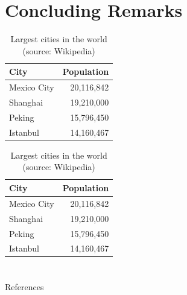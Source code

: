 \documentclass[
10pt,notheorems,compress,hyperref={pdfauthor=Maghfira Ramadhani}
]{beamer}
\begin{document}
\section{Concluding Remarks}
\begin{frame}
    \begin{table}
        \caption{Largest cities in the world (source: Wikipedia)}
        \begin{tabular}{@{} lr @{}}
          \toprule
          City & Population\\
          \midrule
          Mexico City & 20,116,842\\
          Shanghai & 19,210,000\\
          Peking & 15,796,450\\
          Istanbul & 14,160,467\\
          \bottomrule
        \end{tabular}
        \hspace*{1cm}
            \setlength\extrarowheight{3pt}
        \begin{tabular}{|lr|}
          \hline
          \rowcolor{primary}\color{white}City & \color{white}Population\\
          \hline
          Mexico City & 20,116,842\\
          Shanghai & 19,210,000\\
          Peking & 15,796,450\\
          Istanbul & 14,160,467\\
          \hline
        \end{tabular}
    \end{table}
\end{frame}

\section{}
\begin{frame}[allowframebreaks]{References}
    
    
\end{frame}
\end{document}
